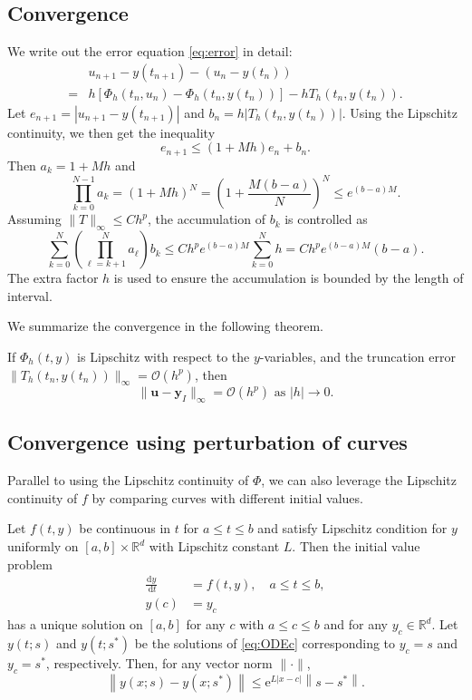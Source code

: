 \documentclass[10pt]{amsart}
\begin{document}
\subsection{Convergence} We write out the error equation \eqref{eq:error} in detail:
\begin{equation}
\begin{aligned}
&u_{n+1} - y(t_{n+1}) - (u_n - y(t_n))\\
={}& h \left [ \Phi_h(t_n, u_n) - \Phi_h(t_n, y(t_n)) \right ] - hT_h(t_n, y(t_n)). 
\end{aligned}
\end{equation}
Let $e_{n+1} = |u_{n+1} - y(t_{n+1})|$ and $b_n = h  |T_h(t_n, y(t_n))|$. Using the Lipschitz continuity, we then get the inequality
$$
e_{n+1} \leq (1+ Mh)e_n + b_n.
$$
Then $a_k = 1 + Mh$ and
$$
\prod_{k=0}^{N-1} a_k = (1 + Mh)^N = \left (1 + \frac{M(b-a)}{N}\right )^N \leq e^{(b-a)M}.
$$
Assuming $\|T\|_{\infty}\leq Ch^p$, the accumulation of $b_k$ is controlled as
$$
\sum_{k=0}^{N}\left(\prod_{\ell=k+1}^{N} a_{\ell}\right) b_k \leq Ch^p e^{(b-a)M} \sum_{k=0}^{N} h = Ch^p e^{(b-a)M}(b-a).
$$
The extra factor $h$ is used to ensure the accumulation is bounded by the length of interval.

We summarize the convergence in the following theorem.
\begin{theorem}
 If ${\Phi}_h(t, y)$ is Lipschitz with respect to the $y$-variables, and the truncation error $\|T_h(t_n, y(t_n))\|_{\infty}= \mathcal O(h^p)$, then
 $$
\|\boldsymbol{u}-\boldsymbol{y}_I\|_{\infty}=\mathcal O\left(h^p\right) \text { as }|h| \rightarrow 0.
$$
\end{theorem}

\subsection{Convergence using perturbation of curves}
Parallel to using the Lipschitz continuity of $\Phi$, we can also leverage the Lipschitz continuity of $f$ by comparing curves with different initial values.  
\begin{lemma}
Let $f(t, y)$ be continuous in $t$ for $a \leq t \leq b$ and satisfy Lipschitz condition for $y$ uniformly on $[a, b] \times \mathbb{R}^d$ with Lipschitz constant $L$. Then the initial value problem
\begin{equation}\label{eq:ODEc}
\begin{aligned}
\frac{\mathrm{d} y}{\mathrm{~d} t} & =f(t, y), \quad a \leq t \leq b, \\
y(c) & =y_c
\end{aligned}
\end{equation}
has a unique solution on $[a, b]$ for any $c$ with $a \leq c \leq b$ and for any $y_c \in \mathbb{R}^d$. Let $y(t; s)$ and $y\left(t ; s^*\right)$ be the solutions of \eqref{eq:ODEc} corresponding to $y_c={s}$ and $y_c=s^*$, respectively. Then, for any vector norm $\|\cdot\|$,
$$
\left\|y(x ; s)-y\left(x ; s^*\right)\right\| \leq \mathrm{e}^{L|x-c|}\left\|s-s^*\right\|.
$$
\end{lemma}
\end{document}
